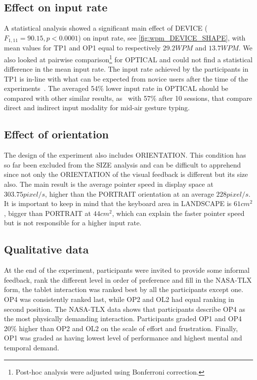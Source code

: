 \documentclass{chi-ext}
\newcommand{\cdt}[1]{{\small\uppercase{{#1}}}}
\begin{document}
\subsection{Effect on input rate}
A statistical analysis showed a significant main effect of \cdt{DEVICE} ($F_{1,11} = 90.15, p < 0.0001$) on input rate, see \autoref{fig:wpm_DEVICE_SHAPE}, with mean values for \cdt{TP1} and \cdt{OP1} equal to respectively $29.2 WPM$ and $13.7 WPM$. We also looked at pairwise comparison\footnote{Post-hoc analysis were adjusted using Bonferroni correction.} for \cdt{OPTICAL} and could not find a statistical difference in the mean input rate. The input rate achieved by the participants in \cdt{TP1} is in-line with what can be expected from novice users after the time of the experiments~\cite{Kristensson2004}. The averaged 54\% lower input rate in \cdt{OPTICAL} should be compared with other similar results, as~\cite{Markussen2014} with 57\% after 10 sessions, that compare direct and indirect input modality for mid-air gesture typing.

\subsection{Effect of orientation}
The design of the experiment also includes \cdt{ORIENTATION}. This condition has so far been excluded from the SIZE analysis and can be difficult to apprehend since not only the \cdt{ORIENTATION} of the visual feedback is different but its size also. The main result is the average pointer speed in display space at $303.75 pixel/s$, higher than the PORTRAIT orientation at an average $228 pixel/s$. It is important to keep in mind that the keyboard area in LANDSCAPE is $61cm^2$, bigger than PORTRAIT at $44cm^2$, which can explain the faster pointer speed but is not responsible for a higher input rate.

\subsection{Qualitative data}
At the end of the experiment, participants were invited to provide some informal feedback, rank the different level in order of preference and fill in the NASA-TLX form, the tablet interaction was ranked best by all the participants except one. \cdt{OP4} was consistently ranked last, while \cdt{OP2} and \cdt{OL2} had equal ranking in second position. The NASA-TLX data shows that participants describe \cdt{OP4} as the most physically demanding interaction. Participants graded \cdt{OP1} and \cdt{OP4} 20\% higher than \cdt{OP2} and \cdt{OL2} on the scale of effort and frustration. Finally, \cdt{OP1} was graded as having lowest level of performance and highest mental and temporal demand.
\end{document}
